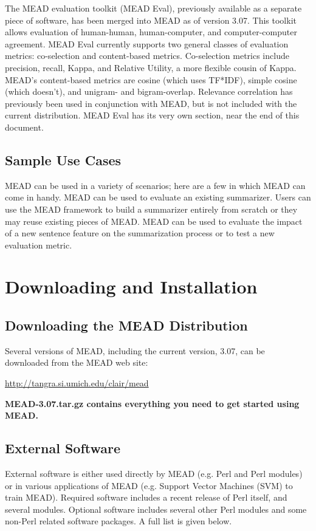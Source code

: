 \documentclass[10pt]{article}
\begin{document}
The MEAD evaluation toolkit (MEAD Eval), previously available as a separate
piece of software, has been merged into MEAD as of version 3.07.
This toolkit allows evaluation of human-human, human-computer, and
computer-computer agreement.  MEAD Eval currently supports two 
general classes of evaluation metrics: co-selection and
content-based metrics.  Co-selection metrics include precision,
recall, Kappa, and Relative Utility, a more flexible cousin of
Kappa.  MEAD's content-based metrics are cosine (which uses
TF*IDF), simple cosine (which doesn't), and unigram- and bigram-overlap.
Relevance correlation has previously been used in conjunction
with MEAD, but is not included with the current distribution.
MEAD Eval has its very own section, near the end of this document.

\subsection{Sample Use Cases}

MEAD can be used in a variety of scenarios; here are a few in
which MEAD can come in handy.  MEAD can be used to evaluate an
existing summarizer.  Users can use the MEAD framework to 
build a summarizer entirely from scratch or they may
reuse existing pieces of MEAD.
MEAD can be used to evaluate the impact of a new sentence feature on the
summarization process or to test a new evaluation metric.



\section{Downloading and Installation}

\subsection{Downloading the MEAD Distribution}
Several versions of MEAD, including the current version, 3.07, 
can be downloaded from the MEAD web site:

\begin{center} \url{http://tangra.si.umich.edu/clair/mead}
\end{center}

{\bf MEAD-3.07.tar.gz contains everything you need to get started
using MEAD.}

\subsection{External Software}
External software is either used directly by MEAD (e.g. Perl and Perl modules)
or in various applications of MEAD (e.g. Support Vector Machines (SVM) 
to train MEAD).  Required software includes a recent release of Perl
itself, and several modules.  Optional software includes several other
Perl modules and some non-Perl related software packages.  A full list
is given below.
\end{document}
